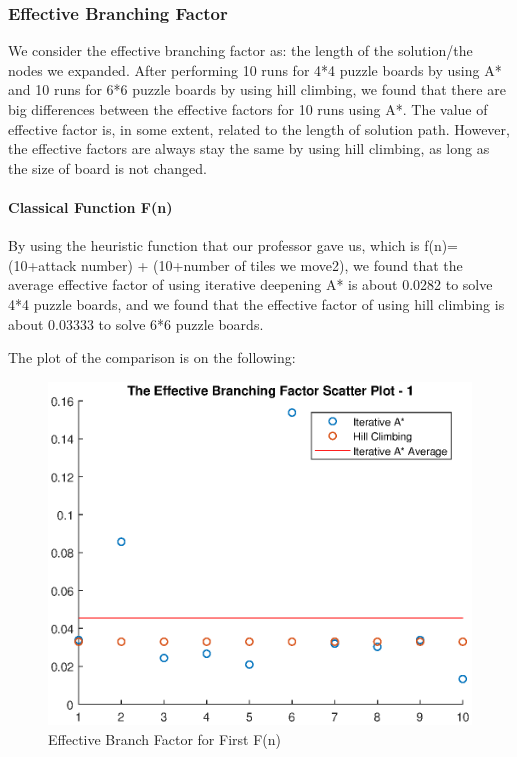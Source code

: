 \documentclass[11pt, a4paper]{article}
\begin{document}
\subsubsection{Effective Branching Factor}


We consider the effective branching factor as: the length of the solution/the nodes we expanded. After performing 10 runs for 4*4 puzzle boards by using A* and 10 runs for 6*6 puzzle boards by using hill climbing, we found that there are big differences between the effective factors for 10 runs using A*. The value of effective factor is, in some extent, related to the length of solution path. However, the effective factors are always stay the same by using hill climbing, as long as the size of board is not changed. 

\paragraph{Classical Function F(n)}


By using the heuristic function that our professor gave us, which is f(n)=(10+attack number) + (10+number of tiles we move2), we found that the average effective factor of using iterative deepening A* is about 0.0282 to solve 4*4 puzzle boards, and we found that the effective factor of using hill climbing is about 0.03333 to solve 6*6 puzzle boards. 

The plot of the comparison is on the following:

\begin{figure}[htbp]
	\centering 
	\includegraphics[scale=0.4]{ebf_1}
	\caption{Effective Branch Factor for First F(n)} %
\end{figure}
\end{document}
